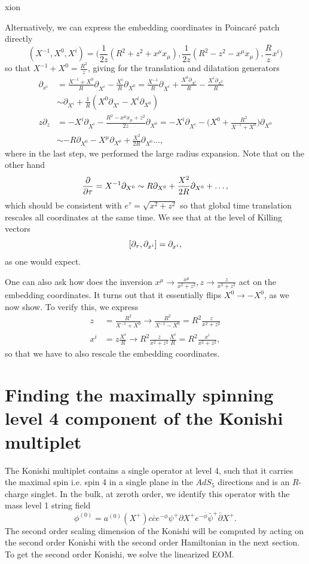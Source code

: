 xion\documentclass[12pt]{article}
\def\be{\begin{equation}}
\def\ee{\end{equation}}
\numberwithin{equation}{section}
\begin{document}
Alternatively, we can express the embedding coordinates in Poincaré patch directly
\be
(X^{-1}, X^0, X^i) = \big(\frac{1}{2z}(R^2+z^2 + x^\mu x_\mu), \frac{1}{2z}(R^2-z^2 - x^\mu x_\mu), \frac{R}{z} x^i\big)
\ee
so that $X^{-1} + X^0 = \frac{R^2}{z}$, giving for the translation and dilatation generators
\be
\begin{aligned}
	\partial_{x^i} &= \frac{X^{-1} + X^{0}}{R} \partial_{X^i} - \frac{X^i}{R} \partial_{X^0} = \frac{X^{-1}}{R} \partial_{X^i} + \frac{X^0 \partial_{X^i}}{R} - \frac{X^i \partial_{X^0}}{R} \\
		       &\sim \partial_{X^i} + \frac{1}{R} (X^0 \partial_{X^i} - X^i \partial_{X^0}) \\
	z \partial_z &= - X^i \partial_{X^i} - \frac{R^2 - x^\mu x_\mu + z^2}{2z} \partial_{X^0} = - X^i \partial_{X^i} - \big(X^0 + \frac{R^2}{X^{-1} + X^0} \big) \partial_{X^0} \\
		     &\sim -R \partial_{X^0} - X^\mu \partial_{X^\mu} + \frac{X^2}{2R} \partial_{X^0} \ldots,
\end{aligned}
\ee
where in the last step, we performed the large radius expansion. Note that on the other hand
\be
\pdv{}{\tau} = X^{-1} \partial_{X^0} \sim R \partial_{X^0} + \frac{X^2}{2R} \partial_{X^0} + \ldots,
\ee
which should be consistent with $e^\tau = \sqrt{x^2 + z^2}$ so that global time translation rescales all coordinates at the same time. We see that at the level of Killing vectors
\be
\comm{\partial_\tau}{\partial_{x^i}} = \partial_{x^i},
\ee
as one would expect.

One can also ask how does the inversion $x^\mu \to \frac{x^\mu}{x^2 + z^2}, z \to \frac{z}{x^2 + z^2}$ act on the embedding coordinates. It turns out that it essentially flips $X^0 \to - X^0$, as we now show. To verify this, we express
\be
\begin{aligned}
	z &= \frac{R^2}{X^{-1} + X^0} \to \frac{R^2}{X^{-1} - X^0} = R^2 \frac{z}{x^2 + z^2} \\
	x^i &= z \frac{X^i}{R} \to R^2 \frac{z}{x^2 + z^2} \frac{X^i}{R} = R^2 \frac{x^i}{x^2 + z^2},
\end{aligned}
\ee
so that we have to also rescale the embedding coordinates.

\section{Finding the maximally spinning level 4 component of the Konishi multiplet}
The Konishi multiplet contains a single operator at level 4, such that it carries the maximal spin i.e. spin 4 in a single plane in the $AdS_5$ directions and is an $R$-charge singlet. In the bulk, at zeroth order, we identify this operator with the mass level 1 string field
\be
\phi^{(0)} = a^{(0)}(X^+) c\bar{c} e^{-\phi} \psi^+ \partial X^+ e^{-\bar{\phi}} \bar{\psi}^+ \bar{\partial} X^+.
\ee
The second order scaling dimension of the Konishi will be computed by acting on the second order Konishi with the second order Hamiltonian in the next section. To get the second order Konishi, we solve the linearized EOM.
\end{document}

